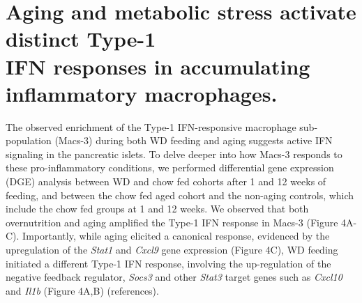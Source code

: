 

\newpage

\section{Aging and metabolic stress activate distinct Type-1\\IFN responses in accumulating inflammatory macrophages.}
\label{sec:endodiff_overview}
The observed enrichment of the Type-1 IFN-responsive macrophage sub-population (Macs-3) during both WD feeding and aging suggests active IFN signaling in the pancreatic islets. To delve deeper into how Macs-3 responds to these pro-inflammatory conditions, we performed differential gene expression (DGE) analysis between WD and chow fed cohorts after 1 and 12 weeks of feeding, and between the chow fed aged cohort and the non-aging controls, which include the chow fed groups at 1 and 12 weeks. We observed that both overnutrition and aging amplified the Type-1 IFN response in Macs-3 (Figure 4A-C). Importantly, while aging elicited a canonical response, evidenced by the upregulation of the \textit{Stat1} and \textit{Cxcl9} gene expression (Figure 4C), WD feeding initiated a different Type-1 IFN response, involving the up-regulation of the negative feedback regulator, \textit{Socs3} and other \textit{Stat3} target genes such as \textit{Cxcl10} and \textit{Il1b} (Figure 4A,B) (references).

